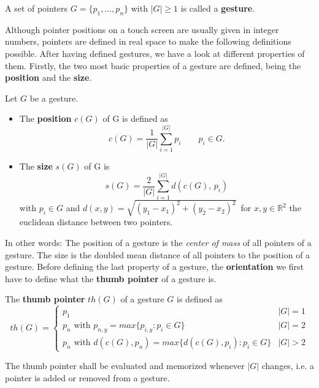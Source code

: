 \begin{defn}
 A set of pointers $G = \{p_1,\dots , p_n\}$ with $|G| \geq 1$ is called a \textbf{gesture}.
\end{defn}

Although pointer positions on a touch screen are usually given in integer numbers, pointers are defined in real space to make the following definitions possible. After having defined gestures, we have a look at different properties of them. Firstly, the two most basic properties of a gesture are defined, being the \textbf{position} and the \textbf{size}.

\begin{defn}
	Let $G$ be a gesture.
	
\begin{itemize}
	\item The \textbf{position} $c(G)$ of G is defined as
	\begin{equation}
	c(G) = \frac{1}{|G|}\sum_{i=1}^{|G|}p_i \qquad  p_i \in G\text{.}
	\end{equation}
	
	\item The \textbf{size} $s(G)$ of G is
	\begin{equation}
	s(G) = \frac{2}{|G|}\sum_{i=1}^{|G|} d(c(G), \, p_i)
	\end{equation}
	with $p_i \in G$ and $d(x, y) = \sqrt{(y_1 - x_1)^2 + (y_2 - x_2)^2}\,$ for $x, y \in \mathbb{R}^2$ the euclidean distance between two pointers.
\end{itemize}
\end{defn}

In other words: The position of a gesture is the \textit{center of mass} of all pointers of a gesture. The size is the doubled mean distance of all pointers to the position of a gesture. Before defining the last property of a gesture, the \textbf{orientation} we first have to define what the \textbf{thumb pointer} of a gesture is.

\begin{defn}
	The \textbf{thumb pointer} $th(G)$ of a gesture $G$ is defined as
	\begin{equation}
	th(G) = \left\{
	\begin{array}{ll}
	p_1 & |G| = 1 \\
	p_n \text{ with } p_{n,y} = max\{p_{i,y} : p_i \in G\} & |G| = 2 \\
	p_n \text{ with } d(c(G), p_n) = max\{ d(c(G), p_i) : p_i \in G \}& |G| > 2
	\end{array}
	\right.
	\end{equation}
	
The thumb pointer shall be evaluated and memorized whenever $|G|$ changes, i.e. a pointer is added or removed from a gesture.
\end{defn}

